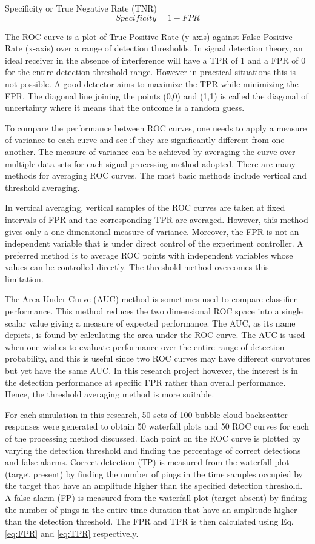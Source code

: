Specificity or True Negative Rate (TNR)
\begin{equation}\label{eq:Specificity}
Specificity= 1 - FPR
\end{equation}

The ROC curve is a plot of True Positive Rate (y-axis) against False
Positive Rate (x-axis) over a range of detection thresholds. In
signal detection theory, an ideal receiver in the absence of
interference will have a TPR of 1 and a FPR of 0 for the entire
detection threshold range. However in practical situations this is
not possible. A good detector aims to maximize the TPR while
minimizing the FPR. The diagonal line joining the points (0,0) and
(1,1) is called the diagonal of uncertainty where it means that the
outcome is a random guess.

To compare the performance between ROC curves, one needs to apply a
measure of variance to each curve and see if they are significantly
different from one another. The measure of variance can be achieved
by averaging the curve over multiple data sets for each signal
processing method adopted. There are many methods for averaging ROC
curves. The most basic methods include vertical and threshold
averaging.

In vertical averaging, vertical samples of the ROC curves are taken
at fixed intervals of FPR and the corresponding TPR are averaged.
However, this method gives only a one dimensional measure of
variance. Moreover, the FPR is not an independent variable that is
under direct control of the experiment controller. A preferred
method is to average ROC points with independent variables whose
values can be controlled directly. The threshold method overcomes
this limitation.

The Area Under Curve (AUC) method is sometimes used to compare
classifier performance. This method reduces the two dimensional ROC
space into a single scalar value giving a measure of expected
performance. The AUC, as its name depicts, is found by calculating
the area under the ROC curve. The AUC is used when one wishes to
evaluate performance over the entire range of detection probability,
and this is useful since two ROC curves may have different
curvatures but yet have the same AUC. In this research project
however, the interest is in the detection performance  at specific
FPR rather than overall performance. Hence, the threshold averaging
method is more suitable.

For each simulation in this research, 50 sets of 100 bubble cloud
backscatter responses were generated to obtain 50 waterfall plots
and 50 ROC curves for each of the processing method discussed. Each
point on the ROC curve is plotted by varying the detection threshold
and finding the percentage of correct detections and false alarms.
Correct detection (TP) is measured from the waterfall plot (target
present) by finding the number of pings in the time samples occupied
by the target that have an amplitude higher than the specified
detection threshold. A false alarm (FP) is measured from the
waterfall plot (target absent) by finding the number of pings in the
entire time duration that have an amplitude higher than the
detection threshold. The FPR and TPR is then calculated using Eq.
\ref{eq:FPR} and \ref{eq:TPR} respectively.

